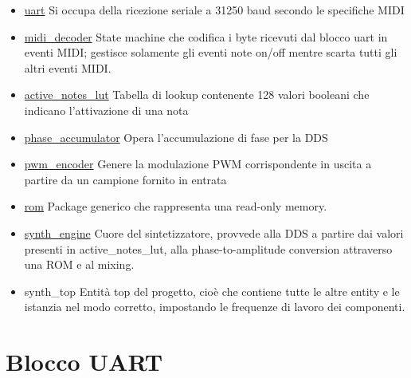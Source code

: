 \begin{itemize}
	\item \hyperref[sec:uart]{uart} Si occupa della ricezione seriale a 31250 baud secondo le specifiche MIDI
	\item \hyperref[sec:mididec]{midi\_decoder}  State machine che codifica i byte ricevuti dal blocco uart in eventi MIDI; gestisce solamente gli eventi note on/off
	mentre scarta tutti gli altri eventi MIDI.
	\item \hyperref[sec:noteslut]{active\_notes\_lut} Tabella di lookup contenente 128 valori booleani che indicano l'attivazione di una nota
	\item \hyperref[sec:phaseaccumulator]{phase\_accumulator} Opera l'accumulazione di fase per la DDS
	\item \hyperref[sec:pwmencoder]{pwm\_encoder} Genere la modulazione PWM corrispondente in uscita
	a partire da un campione fornito in entrata
	\item \hyperref[sec:rom]{rom} Package generico che rappresenta una read-only memory.
	\item \hyperref[sec:synthengine]{synth\_engine} Cuore del sintetizzatore, provvede alla DDS a partire dai valori presenti in active\_notes\_lut, alla phase-to-amplitude conversion attraverso una ROM e al mixing.
	\item synth\_top Entità top del progetto, cioè che contiene tutte le altre entity e le istanzia nel modo corretto, impostando le frequenze di lavoro dei componenti.
\end{itemize}

\section{Blocco UART}
\label{sec:uart}


\begin{center}
\end{center}

